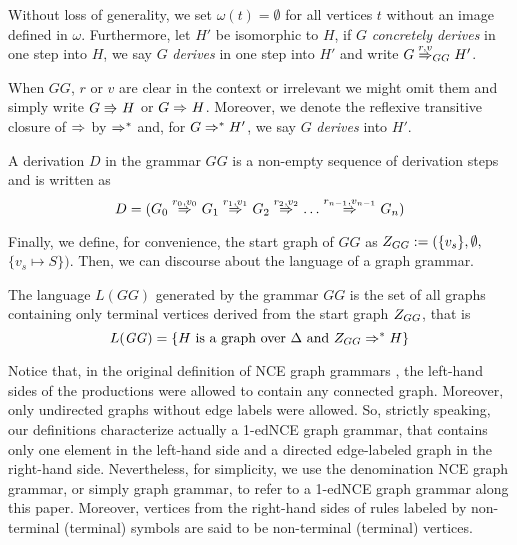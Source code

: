 \documentclass[runningheads]{llncs}
\begin{document}
Without loss of generality, we set $\omega(t) = \emptyset$ for all vertices $t$ without an image defined in $\omega$. Furthermore, let $H'$ be isomorphic to $H$, if $G$ \textit{concretely derives} in one step into $H$, we say $G$ \textit{derives} in one step into $H'$ and write $G \deriv{r}{v}{GG} H'$. 

When $\mathit{GG}$, $r$ or $v$ are clear in the context or irrelevant we might omit them and simply write $G \cderiv{}{}{} H$ or $G \deriv{}{}{} H$. Moreover, we denote the reflexive transitive closure of $\deriv{}{}{}$ by $\Rightarrow^*_{}$ and, for $G \Rightarrow^*_{} H'$, we say $G$ \textit{derives} into $H'$.

\begin{definition}
	A derivation $D$ in the grammar $\mathit{GG}$ is a non-empty sequence of derivation steps and is written as
	\begin{equation*}
	D = (G_0 \deriv{r_0}{v_0}{} G_1 \deriv{r_1}{v_1}{} G_2 \deriv{r_2}{v_2}{} \dots \deriv{r_{n-1}}{v_{n-1}}{} G_n)
	\end{equation*}
\end{definition}

Finally, we define, for convenience, the start graph of $\mathit{GG}$ as $Z_{GG} := (\{v_s\}, \emptyset,$ $\{v_s \mapsto S\})$. Then, we can discourse about the language of a graph grammar.

\begin{definition}
	\label{def:language}
	The language $L(\mathit{GG})$ generated by the grammar $\mathit{GG}$ is the set of all graphs containing only terminal vertices derived from the start graph $Z_{GG}$, that is
	\begin{equation*}
	L(\mathit{GG}) = \{H \text{ is a graph over } \Delta \text{ and } Z_{GG} \Rightarrow^*_{} H\}
	\end{equation*}
\end{definition}

Notice that, in the original definition of NCE graph grammars \cite{janssens1982graph}, the left-hand sides of the productions were allowed to contain any connected graph. Moreover, only undirected graphs without edge labels were allowed. So, strictly speaking, our definitions characterize actually a 1-edNCE graph grammar, that contains only one element in the left-hand side and a directed edge-labeled graph in the right-hand side. Nevertheless, for simplicity, we use the denomination NCE graph grammar, or simply graph grammar, to refer to a 1-edNCE graph grammar along this paper. Moreover, vertices from the right-hand sides of rules labeled by non-terminal (terminal) symbols are said to be non-terminal (terminal) vertices.
\end{document}
